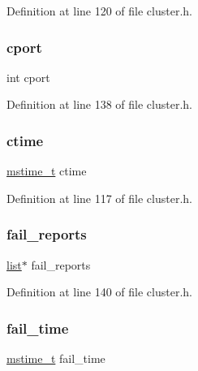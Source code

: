 Definition at line 120 of file cluster.\+h.

\mbox{\label{structcluster_node_afe812fe7dea7e3685c4f5ad39803556d}} 
\subsubsection{\texorpdfstring{cport}{cport}}
{\footnotesize\ttfamily int cport}



Definition at line 138 of file cluster.\+h.

\mbox{\label{structcluster_node_a7e18258d5320891f16483de560a5a551}} 
\subsubsection{\texorpdfstring{ctime}{ctime}}
{\footnotesize\ttfamily \hyperlink{redismodule_8h_a652ae61e2475bc8957454534544968fc}{mstime\+\_\+t} ctime}



Definition at line 117 of file cluster.\+h.

\mbox{\label{structcluster_node_af865165e6c13a20888fba35e4bfbc496}} 
\subsubsection{\texorpdfstring{fail\+\_\+reports}{fail\_reports}}
{\footnotesize\ttfamily \hyperlink{structlist}{list}$\ast$ fail\+\_\+reports}



Definition at line 140 of file cluster.\+h.

\mbox{\label{structcluster_node_adbfcc788af3c74e0607f1daa843d487e}} 
\subsubsection{\texorpdfstring{fail\+\_\+time}{fail\_time}}
{\footnotesize\ttfamily \hyperlink{redismodule_8h_a652ae61e2475bc8957454534544968fc}{mstime\+\_\+t} fail\+\_\+time}



